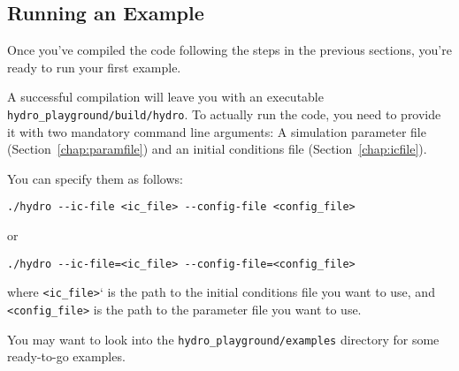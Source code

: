 






\subsection{Running an Example}


Once you've compiled the code following the steps in the previous sections,
you're ready to run your first example.

A successful compilation will leave you with an executable
\verb|hydro_playground/build/hydro|. To actually run the code, you need to
provide it with two mandatory command line arguments: A simulation parameter
file (Section~\ref{chap:paramfile}) and an initial conditions file
(Section~\ref{chap:icfile}).

You can specify them as follows:

\begin{lstlisting}
./hydro --ic-file <ic_file> --config-file <config_file>
\end{lstlisting}

or

\begin{lstlisting}
./hydro --ic-file=<ic_file> --config-file=<config_file>
\end{lstlisting}

where \verb|<ic_file>|` is the path to the initial conditions file you want to
use, and \verb|<config_file>| is the path to the parameter file you want to use.

You may want to look into the \verb|hydro_playground/examples| directory for
some ready-to-go examples.



